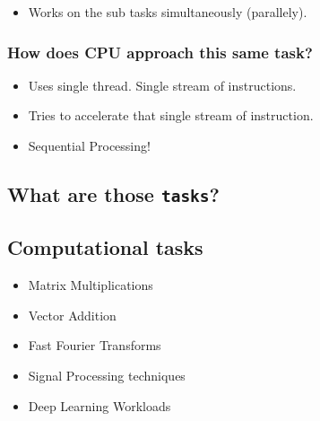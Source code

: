 \documentclass[11pt]{article}
\providecommand{\tightlist}{%
      \setlength{\itemsep}{0pt}\setlength{\parskip}{0pt}}
\begin{document}
    \begin{itemize}
\tightlist
\item
  Works on the sub tasks simultaneously (parallely).
\end{itemize}

    \subsubsection{How does CPU approach this same
task?}\label{how-does-cpu-approach-this-same-task}

    \begin{itemize}
\tightlist
\item
  Uses single thread. Single stream of instructions.
\end{itemize}

    \begin{itemize}
\tightlist
\item
  Tries to accelerate that single stream of instruction.
\end{itemize}

    \begin{itemize}
\tightlist
\item
  Sequential Processing!
\end{itemize}

    \subsection{\texorpdfstring{What are those
\texttt{tasks}?}{What are those tasks?}}\label{what-are-those-tasks}

    \subsection{Computational tasks}\label{computational-tasks}

    \begin{itemize}
\tightlist
\item
  Matrix Multiplications
\item
  Vector Addition
\item
  Fast Fourier Transforms
\end{itemize}

    \begin{itemize}
\tightlist
\item
  Signal Processing techniques
\item
  Deep Learning Workloads
\end{itemize}
\end{document}
